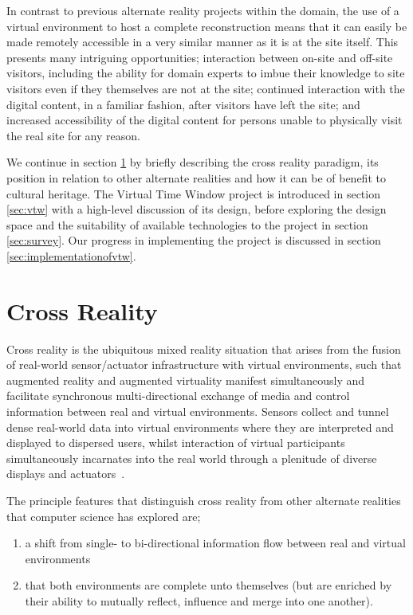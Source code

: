 \documentclass[conference,a4paper]{IEEEtran}
\begin{document}
In contrast to previous alternate reality projects within the domain, the use of a virtual environment to host a complete reconstruction means that it can easily be made remotely accessible in a very similar manner as it is at the site itself. This presents many intriguing opportunities; interaction between on-site and off-site visitors, including the ability for domain experts to imbue their knowledge to site visitors even if they themselves are not at the site; continued interaction with the digital content, in a familiar fashion, after visitors have left the site; and increased accessibility of the digital content for persons unable to physically visit the real site for any reason.

We continue in section \ref{sec:background} by briefly describing the cross reality paradigm, its position in relation to other alternate realities and how it can be of benefit to cultural heritage. The Virtual Time Window project is introduced in section \ref{sec:vtw} with a high-level discussion of its design, before exploring the design space and the suitability of available technologies to the project in section \ref{sec:survey}. Our progress in implementing the project is discussed in section \ref{sec:implementationofvtw}.

\section{Cross Reality}
\label{sec:background}
Cross reality is the ubiquitous mixed reality situation that arises from the fusion of real-world sensor/actuator infrastructure with virtual environments, such that augmented reality and augmented virtuality manifest simultaneously and facilitate synchronous multi-directional exchange of media and control information between real and virtual environments. Sensors collect and tunnel dense real-world data into virtual environments where they are interpreted and displayed to dispersed users, whilst interaction of virtual participants simultaneously incarnates into the real world through a plenitude of diverse displays and actuators~\cite{Paradiso2009}.

The principle features that distinguish cross reality from other alternate realities that computer science has explored are;
\begin{enumerate}
	\item a shift from single- to bi-directional information flow between real and virtual environments~\cite{kim:practical}
	\item that both environments are complete unto themselves (but are enriched by their ability to mutually reflect, influence and merge into one another).~\cite{lifton:merging}
\end{enumerate}
\end{document}
